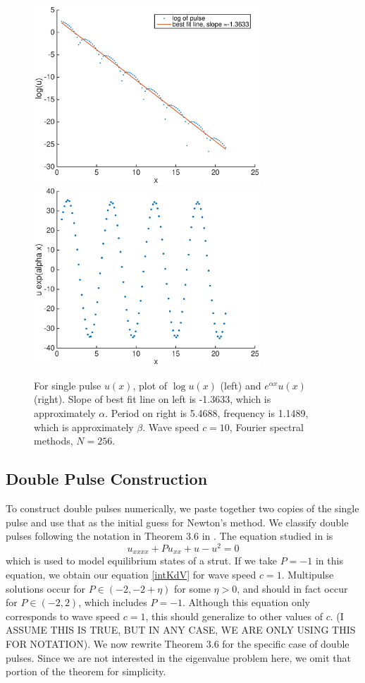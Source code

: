 \documentclass[12pt]{article}
\begin{document}
\begin{figure}[H]
	\includegraphics[width=8.5cm]{decaysinglepulse.eps}
	\includegraphics[width=8.5cm]{oscsinglepulse.eps}
	\caption{For single pulse $u(x)$, plot of $\log u(x)$ (left) and $e^{\alpha x} u(x)$ (right). Slope of best fit line on left is -1.3633, which is approximately $\alpha$. Period on right is 5.4688, frequency is 1.1489, which is approximately $\beta$. Wave speed $c = 10$, Fourier spectral methods, $N = 256$.}
\end{figure}

\subsection{Double Pulse Construction}

To construct double pulses numerically, we paste together two copies of the single pulse and use that as the initial guess for Newton's method. We classify double pulses following the notation in Theorem 3.6 in \cite{Sandstede1997}. The equation studied in \cite{Sandstede1997} is
\begin{equation}\label{strut}
u_{xxxx} + Pu_{xx} + u - u^2 = 0
\end{equation}
which is used to model equilibrium states of a strut. If we take $P = -1$ in this equation, we obtain our equation \eqref{intKdV} for wave speed $c = 1$. Multipulse solutions occur for $P \in (-2, -2 + \eta)$ for some $\eta > 0$, and should in fact occur for $P \in (-2, 2)$, which includes $P = -1$. Although this equation only corresponds to wave speed $c = 1$, this should generalize to other values of $c$. (I ASSUME THIS IS TRUE, BUT IN ANY CASE, WE ARE ONLY USING THIS FOR NOTATION). We now rewrite Theorem 3.6 for the specific case of double pulses. Since we are not interested in the eigenvalue problem here, we omit that portion of the theorem for simplicity.
\end{document}
